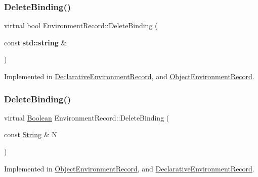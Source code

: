 \mbox{\label{struct_environment_record_a41079a3969168b9fc4839fd89aa14dc0}} 
\subsubsection{\texorpdfstring{Delete\+Binding()}{DeleteBinding()}\hspace{0.1cm}{\footnotesize\ttfamily [1/2]}}
{\footnotesize\ttfamily virtual bool Environment\+Record\+::\+Delete\+Binding (\begin{DoxyParamCaption}\item[{const \textbf{ std\+::string} \&}]{ }\end{DoxyParamCaption})\hspace{0.3cm}{\ttfamily [pure virtual]}}



Implemented in \hyperlink{struct_declarative_environment_record_ae21d2a351ca2b69110f11ffe13fd2380}{Declarative\+Environment\+Record}, and \hyperlink{struct_object_environment_record_a19be623695ff3da2895707cde2e014b9}{Object\+Environment\+Record}.

\mbox{\label{struct_environment_record_ac8fe8ad8e0146d5d7e3d9c0f3d873717}} 
\subsubsection{\texorpdfstring{Delete\+Binding()}{DeleteBinding()}\hspace{0.1cm}{\footnotesize\ttfamily [2/2]}}
{\footnotesize\ttfamily virtual \hyperlink{struct_boolean}{Boolean} Environment\+Record\+::\+Delete\+Binding (\begin{DoxyParamCaption}\item[{const \hyperlink{struct_string}{String} \&}]{N }\end{DoxyParamCaption})\hspace{0.3cm}{\ttfamily [pure virtual]}}



Implemented in \hyperlink{struct_object_environment_record_a86c73af4072c8a60c80ca98113f608fd}{Object\+Environment\+Record}, and \hyperlink{struct_declarative_environment_record_a853cee614241af5f32d9d3cb11d7e6d6}{Declarative\+Environment\+Record}.

